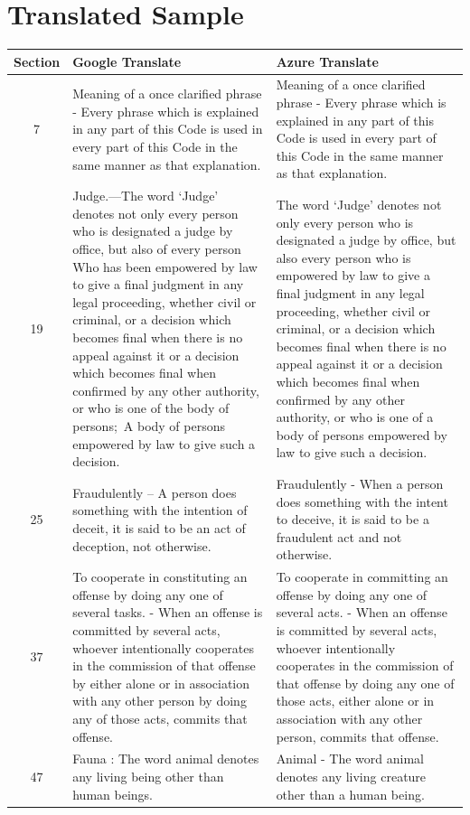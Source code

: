 \section*{Translated Sample}

\singlespacing
\begin{tabular}{|c|p{6cm}|p{6cm}|}
\hline
\textbf{Section} & \textbf{Google Translate} & \textbf{Azure Translate} \\
\hline
7 & Meaning of a once clarified phrase - Every phrase which is explained in any part of this Code is used in every part of this Code in the same manner as that explanation. & Meaning of a once clarified phrase - Every phrase which is explained in any part of this Code is used in every part of this Code in the same manner as that explanation. \\
\hline
19 & Judge.—The word `Judge' denotes not only every person who is designated a judge by office, but also of every person  Who has been empowered by law to give a final judgment in any legal proceeding, whether civil or criminal, or a decision which becomes final when there is no appeal against it or a decision which becomes final when confirmed by any other authority, or who is one of the body of persons; A body of persons empowered by law to give such a decision. & The word `Judge' denotes not only every person who is designated a judge by office, but also every person who is empowered by law to give a final judgment in any legal proceeding, whether civil or criminal, or a decision which becomes final when there is no appeal against it or a decision which becomes final when confirmed by any other authority, or who is one of a body of persons empowered by law to give such a decision.  \\
\hline
25 & Fraudulently – A person does something with the intention of deceit, it is said to be an act of deception, not otherwise. & Fraudulently - When a person does something with the intent to deceive, it is said to be a fraudulent act and not otherwise. \\
\hline
37 & To cooperate in constituting an offense by doing any one of several tasks. - When an offense is committed by several acts, whoever intentionally cooperates in the commission of that offense by either alone or in association with any other person by doing any of those acts, commits that offense. & To cooperate in committing an offense by doing any one of several acts. - When an offense is committed by several acts, whoever intentionally cooperates in the commission of that offense by doing any one of those acts, either alone or in association with any other person, commits that offense. \\
\hline
47 & Fauna : The word animal denotes any living being other than human beings. & Animal - The word animal denotes any living creature other than a human being. \\
\hline
\end{tabular}

